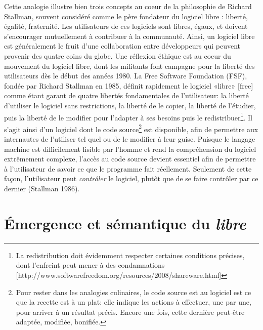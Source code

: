 \documentclass[
  letterpaper,
]{scrbook}
\begin{document}
Cette analogie illustre bien trois concepts au coeur de la philosophie
de Richard Stallman, souvent considéré comme le père fondateur du
logiciel libre : liberté, égalité, fraternité. Les utilisateurs de ces
logiciels sont libres, égaux, et doivent s'encourager mutuellement à
contribuer à la communauté. Ainsi, un logiciel libre est généralement le
fruit d'une collaboration entre développeurs qui peuvent provenir des
quatre coins du globe. Une réflexion éthique est au coeur du mouvement
du logiciel libre, dont les militants font campagne pour la liberté des
utilisateurs dès le début des années 1980. La Free Software Foundation
(FSF), fondée par Richard Stallman en 1985, définit rapidement le
logiciel «libre» {[}free{]} comme étant garant de quatre libertés
fondamentales de l'utilisateur: la liberté d'utiliser le logiciel sans
restrictions, la liberté de le copier, la liberté de l'étudier, puis la
liberté de le modifier pour l'adapter à ses besoins puis le
redistribuer\footnote{La redistribution doit évidemment respecter
  certaines conditions précises, dont l'enfreint peut mener à des
  condamnations
  {[}http://www.softwarefreedom.org/resources/2008/shareware.html{]}}.
Il s'agit ainsi d'un logiciel dont le code source\footnote{Pour rester
  dans les analogies culinaires, le code source est au logiciel est ce
  que la recette est à un plat: elle indique les actions à effectuer,
  une par une, pour arriver à un résultat précis. Encore une fois, cette
  dernière peut-être adaptée, modifiée, bonifiée.} est disponible, afin
de permettre aux internautes de l'utiliser tel quel ou de le modifier à
leur guise. Puisque le langage machine est difficilement lisible par
l'homme et rend la compréhension du logiciel extrêmement complexe,
l'accès au code source devient essentiel afin de permettre à
l'utilisateur de savoir ce que le programme fait réellement. Seulement
de cette façon, l'utilisateur peut \emph{contrôler} le logiciel, plutôt
que de se faire contrôler par ce dernier (Stallman 1986).

\hypertarget{uxe9mergence-et-suxe9mantique-du-libre}{%
\section{\texorpdfstring{Émergence et sémantique du
\emph{libre}}{Émergence et sémantique du libre}}\label{uxe9mergence-et-suxe9mantique-du-libre}}
\end{document}
